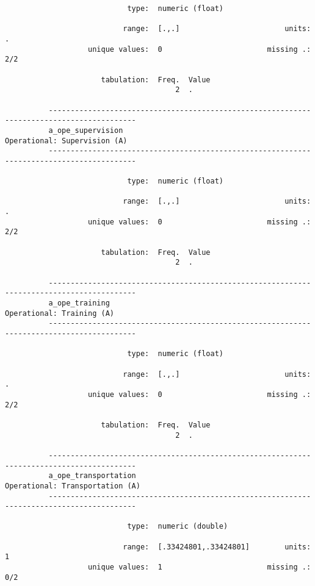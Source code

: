 \documentclass{article}
\begin{document}
\begin{verbatim}
                            type:  numeric (float)
          
                           range:  [.,.]                        units:  .
                   unique values:  0                        missing .:  2/2
          
                      tabulation:  Freq.  Value
                                       2  .
          
          ------------------------------------------------------------------------------------------
          a_ope_supervision                                             Operational: Supervision (A)
          ------------------------------------------------------------------------------------------
          
                            type:  numeric (float)
          
                           range:  [.,.]                        units:  .
                   unique values:  0                        missing .:  2/2
          
                      tabulation:  Freq.  Value
                                       2  .
          
          ------------------------------------------------------------------------------------------
          a_ope_training                                                   Operational: Training (A)
          ------------------------------------------------------------------------------------------
          
                            type:  numeric (float)
          
                           range:  [.,.]                        units:  .
                   unique values:  0                        missing .:  2/2
          
                      tabulation:  Freq.  Value
                                       2  .
          
          ------------------------------------------------------------------------------------------
          a_ope_transportation                                       Operational: Transportation (A)
          ------------------------------------------------------------------------------------------
          
                            type:  numeric (double)
          
                           range:  [.33424801,.33424801]        units:  1
                   unique values:  1                        missing .:  0/2
          

\end{verbatim}
\end{document}

